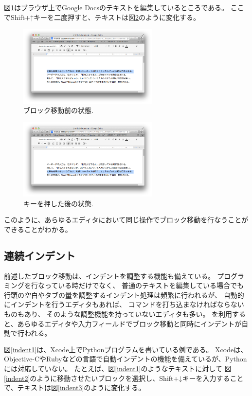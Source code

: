 図\ref{move3}はブラウザ上でGoogle Docsのテキストを編集しているところである。
ここでShift+↑キーを二度押すと、テキストは図\ref{move4}のように変化する。

\begin{figure}[H]
\centerline{\includegraphics[width=70mm,bb=0 0 935 542]{figures/block4.png}}
\caption{ブロック移動前の状態.}
\label{move3}
\end{figure}

\begin{figure}[H]
\centerline{\includegraphics[width=70mm,bb=0 0 935 542]{figures/block5.png}}
\caption{キーを押した後の状態.}
\label{move4}
\end{figure}

このように、あらゆるエディタにおいて同じ操作でブロック移動を行なうことができることがわかる。

\subsection{連続インデント}

前述したブロック移動は、インデントを調整する機能も備えている。
プログラミングを行なっている時だけでなく、
普通のテキストを編集している場合でも
行頭の空白やタブの量を調整するインデント処理は頻繁に行われるが、
自動的にインデントを行うエディタもあれば、
コマンドを打ち込まなければならないものもあり、
そのような調整機能を持っていないエディタも多い。
{\system}を利用すると、あらゆるエディタや入力フィールドでブロック移動と同時にインデントが自動で行われる。

図\ref{indent1}は、Xcode上でPythonプログラムを書いている例である。
Xcodeは、Objective-CやRubyなどの言語で自動インデントの機能を備えているが、Pythonには対応していない。
たとえば、図\ref{indent1}のようなテキストに対して
図\ref{indent2}のように移動させたいブロックを選択し、Shift+↓キーを入力することで、テキストは図\ref{indent3}のように変化する。

